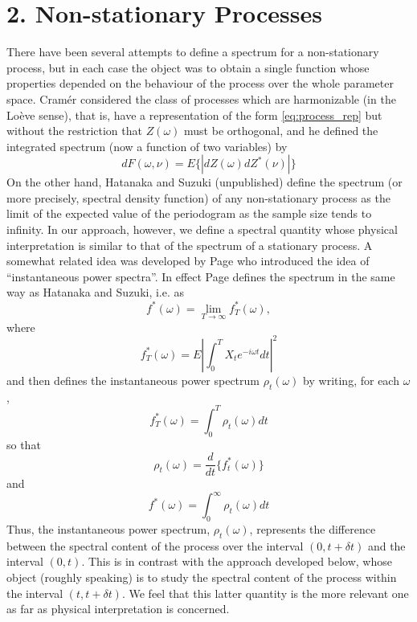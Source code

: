 \documentclass{article}
\begin{document}
\section*{2. Non-stationary Processes}

There have been several attempts to define a spectrum for a non-stationary
process, but in each case the object was to obtain a single function whose
properties depended on the behaviour of the process over the whole parameter
space. Cram{\'e}r {\cite{cramer1960}} considered the class of processes which
are harmonizable (in the Lo{\`e}ve sense), that is, have a representation of
the form \eqref{eq:process_rep} but without the restriction that $Z (\omega)$
must be orthogonal, and he defined the integrated spectrum (now a function of
two variables) by
\begin{equation}
  \label{eq:integrated_spectrum} dF (\omega, \nu) = E \{|dZ (\omega) dZ^{\ast}
  (\nu) |\}
\end{equation}
On the other hand, Hatanaka and Suzuki (unpublished) define the spectrum (or
more precisely, spectral density function) of any non-stationary process as
the limit of the expected value of the periodogram as the sample size tends to
infinity. In our approach, however, we define a spectral quantity whose
physical interpretation is similar to that of the spectrum of a stationary
process. A somewhat related idea was developed by Page {\cite{page1952}} who
introduced the idea of ``instantaneous power spectra''. In effect Page defines
the spectrum in the same way as Hatanaka and Suzuki, i.e. as
\begin{equation}
  \label{eq:page_spectrum1} f^{\ast} (\omega) = \lim_{T \rightarrow \infty}
  f_T^{\ast} (\omega),
\end{equation}
where
\begin{equation}
  \label{eq:page_spectrum2} f_T^{\ast} (\omega) = E \left| \int_0^T X_t e^{- i
  \omega t} dt \right|^2
\end{equation}
and then defines the instantaneous power spectrum $\rho_t (\omega)$ by
writing, for each $\omega$,
\begin{equation}
  \label{eq:page_spectrum3} f_T^{\ast} (\omega) = \int_0^T \rho_t (\omega) dt
\end{equation}
so that
\begin{equation}
  \label{eq:page_spectrum4} \rho_t (\omega) = \frac{d}{dt} \{f_t^{\ast}
  (\omega)\}
\end{equation}
and
\begin{equation}
  \label{eq:page_spectrum5} f^{\ast} (\omega) = \int_0^{\infty} \rho_t
  (\omega) dt
\end{equation}
Thus, the instantaneous power spectrum, $\rho_t (\omega)$, represents the
difference between the spectral content of the process over the interval $(0,
t + \delta t)$ and the interval $(0, t)$. This is in contrast with the
approach developed below, whose object (roughly speaking) is to study the
spectral content of the process within the interval $(t, t + \delta t)$. We
feel that this latter quantity is the more relevant one as far as physical
interpretation is concerned.
\end{document}
